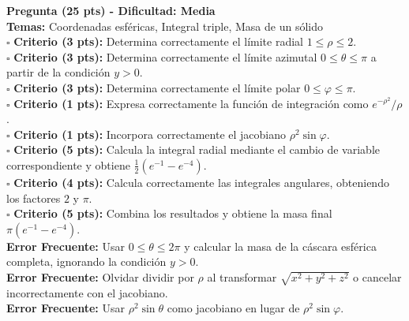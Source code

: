 \documentclass[12pt]{article}
\newenvironment{pregunta}[4]{
  \vspace{0.3cm}\noindent\textbf{Pregunta (#2 pts) - Dificultad: #3}\\
  \textbf{Temas:} #4\\[0.2cm]
}{
  \vspace{0.3cm}
}
\newcommand{\criterio}[2]{
  \noindent $\square$ \textbf{Criterio (#2 pts):} #1 \\
}
\newcommand{\errorfrecuente}[1]{
  \noindent \textbf{Error Frecuente:} #1 \\
}
\begin{document}
\begin{pregunta}{examen-mv-2024-p3}{25}{Media}{Coordenadas esféricas, Integral triple, Masa de un sólido}
\criterio{Determina correctamente el límite radial $1\leq\rho\leq2$.}{3}
\criterio{Determina correctamente el límite azimutal $0\leq\theta\leq\pi$ a partir de la condición $y>0$.}{3}
\criterio{Determina correctamente el límite polar $0\leq\varphi\leq\pi$.}{3}
\criterio{Expresa correctamente la función de integración como $e^{-\rho^2}/\rho$.}{1}
\criterio{Incorpora correctamente el jacobiano $\rho^2\sin\varphi$.}{1}
\criterio{Calcula la integral radial mediante el cambio de variable correspondiente y obtiene $\frac12(e^{-1}-e^{-4})$.}{5}
\criterio{Calcula correctamente las integrales angulares, obteniendo los factores $2$ y $\pi$.}{4}
\criterio{Combina los resultados y obtiene la masa final $\pi(e^{-1}-e^{-4})$.}{5}

\errorfrecuente{Usar $0\leq\theta\leq2\pi$ y calcular la masa de la cáscara esférica completa, ignorando la condición $y>0$.}
\errorfrecuente{Olvidar dividir por $\rho$ al transformar $\sqrt{x^2+y^2+z^2}$ o cancelar incorrectamente con el jacobiano.}
\errorfrecuente{Usar $\rho^2\sin\theta$ como jacobiano en lugar de $\rho^2\sin\varphi$.}
\end{pregunta}
\end{document}
